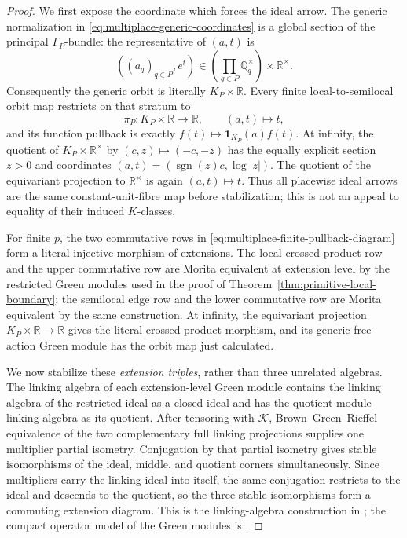 \begin{proof}
We first expose the coordinate which forces the ideal arrow.  The generic
normalization in
\eqref{eq:multiplace-generic-coordinates} is a global section of the
principal $\Gamma_P$-bundle: the representative of $(a,t)$ is
\[
 ((a_q)_{q\in P},e^t)\in
 \left(\prod_{q\in P}\mathbb Q_q^\times\right)\times\mathbb R^\times.
\]
Consequently the generic orbit is literally $K_P\times\mathbb R$.  Every
finite local-to-semilocal orbit map restricts on that stratum to
\[
 \pi_P:K_P\times\mathbb R\longrightarrow\mathbb R,
 \qquad (a,t)\longmapsto t,
\]
and its function pullback is exactly
$f(t)\mapsto\mathbf1_{K_P}(a)f(t)$.  At infinity, the quotient of
$K_P\times\mathbb R^\times$ by $(c,z)\mapsto(-c,-z)$ has the equally
explicit section $z>0$ and coordinates $(a,t)=(\operatorname{sgn}(z)c,
\log|z|)$.  The quotient of the equivariant projection to
$\mathbb R^\times$ is again $(a,t)\mapsto t$.  Thus all placewise ideal
arrows are the same constant-unit-fibre map before stabilization; this is not
an appeal to equality of their induced $K$-classes.

For finite $p$, the two commutative rows in
\eqref{eq:multiplace-finite-pullback-diagram} form a literal injective
morphism of extensions.  The local crossed-product row and the upper
commutative row are Morita equivalent at extension level by the restricted
Green modules used in the proof of
Theorem~\ref{thm:primitive-local-boundary}; the semilocal edge row and the
lower commutative row are Morita equivalent by the same construction.  At
infinity, the equivariant projection
$K_P\times\mathbb R\to\mathbb R$ gives the literal crossed-product morphism,
and its generic free-action Green module has the orbit map just calculated.

We now stabilize these \emph{extension triples}, rather than three unrelated
algebras.  The linking algebra of each extension-level Green module contains
the linking algebra of the restricted ideal as a closed ideal and has the
quotient-module linking algebra as its quotient.  After tensoring with
$\mathcal K$, Brown--Green--Rieffel equivalence of the two complementary full
linking projections supplies one multiplier partial isometry.  Conjugation by
that partial isometry gives stable isomorphisms of the ideal, middle, and
quotient corners simultaneously.  Since multipliers carry the linking ideal
into itself, the same conjugation restricts to the ideal and descends to the
quotient, so the three stable isomorphisms form a commuting extension
diagram.  This is the linking-algebra construction in
\cite[Theorems~1.1--1.2, pp.~349--352]{brownGreenRieffel1977}; the compact
operator model of the Green modules is
\cite[Theorem~1.3.22, p.~14]{meslandSengun2025}.


\end{proof}

